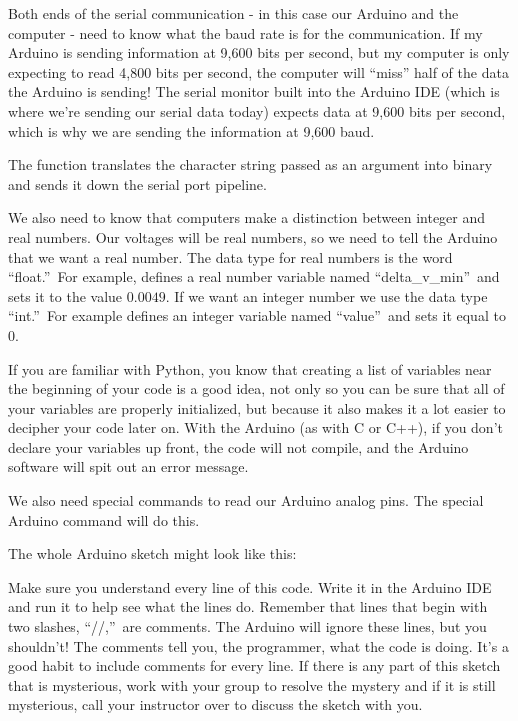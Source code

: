 Both ends of the serial communication - in this case our Arduino and the 
computer - need to know what the baud rate is for the communication. If my 
Arduino is sending information at 9,600 bits per second, but my computer is 
only expecting to read 4,800 bits per second, the computer will ``miss'' half 
of the data the Arduino is sending! The serial monitor built into the Arduino 
IDE (which is where we're sending our serial data today) expects data at 
9,600 bits per second, which is why we are sending the information at 
9,600 baud.

The  function translates the 
character string passed as an argument into binary and sends it down the 
serial port pipeline.

We also need to know that computers make a distinction between integer and
real numbers. Our voltages will be real numbers, so we need to tell the
Arduino that we want a real number. The data type for real numbers is the word
\textquotedblleft float.\textquotedblright\ For example,
defines a real number 
variable named \textquotedblleft delta\_v\_min\textquotedblright\
and sets it to the value $0.0049.$ If we want an integer number we use the
data type \textquotedblleft int.\textquotedblright\ For example
defines an integer 
variable named \textquotedblleft value\textquotedblright\ and sets
it equal to 0. 

If you are familiar with Python, you know that creating a list of variables
near the beginning of your code is a good idea, not only so you can be sure
that all of your variables are properly initialized, but because it also makes
it a lot easier to decipher your code later on. With the Arduino (as with C or 
C++), if you don't declare your variables up front, the code will not compile, 
and the Arduino software will spit out an error message.

We also need special commands to read our Arduino analog pins. The special
Arduino command \code{analogRead();}  
will do this.

The whole Arduino sketch might look like this:


Make sure you understand every line of this code. Write it in the Arduino
IDE and run it to help see what the lines do. Remember that lines that 
begin with two
slashes, \textquotedblleft //,\textquotedblright\ are comments. The Arduino
will ignore these lines, but you shouldn't! The comments tell you, the
programmer, what the code is doing. It's a good habit to include comments
for every line. If there is any part of this sketch that is mysterious, work
with your group to resolve the mystery and if it is still mysterious, call
your instructor over to discuss the sketch with you.

